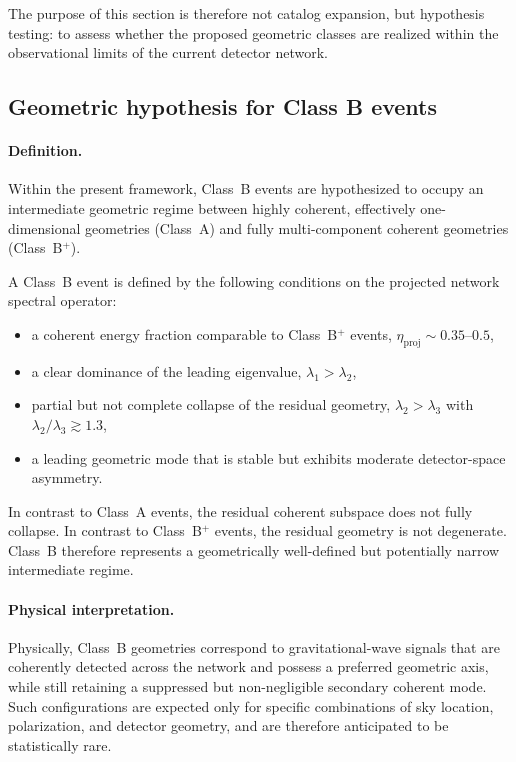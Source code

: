 \documentclass[11pt,a4paper]{article}
\begin{document}
The purpose of this section is therefore not catalog expansion, but hypothesis testing:
to assess whether the proposed geometric classes are realized within the observational
limits of the current detector network.

\subsection{Geometric hypothesis for Class B events}

\paragraph{Definition.}
Within the present framework, Class~B events are hypothesized to occupy an intermediate
geometric regime between highly coherent, effectively one-dimensional geometries
(Class~A) and fully multi-component coherent geometries (Class~B$^+$).

A Class~B event is defined by the following conditions on the projected network spectral
operator:
\begin{itemize}
\item a coherent energy fraction comparable to Class~B$^+$ events,
      $\eta_{\mathrm{proj}} \sim 0.35$--$0.5$,
\item a clear dominance of the leading eigenvalue,
      $\lambda_1 > \lambda_2$,
\item partial but not complete collapse of the residual geometry,
      $\lambda_2 > \lambda_3$ with $\lambda_2/\lambda_3 \gtrsim 1.3$,
\item a leading geometric mode that is stable but exhibits moderate detector-space
      asymmetry.
\end{itemize}

In contrast to Class~A events, the residual coherent subspace does not fully collapse.
In contrast to Class~B$^+$ events, the residual geometry is not degenerate.
Class~B therefore represents a geometrically well-defined but potentially narrow
intermediate regime.

\paragraph{Physical interpretation.}
Physically, Class~B geometries correspond to gravitational-wave signals that are coherently
detected across the network and possess a preferred geometric axis, while still retaining
a suppressed but non-negligible secondary coherent mode.
Such configurations are expected only for specific combinations of sky location,
polarization, and detector geometry, and are therefore anticipated to be statistically
rare.
\end{document}
